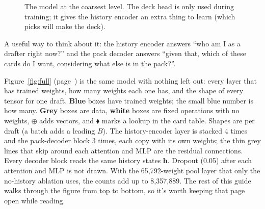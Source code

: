 \documentclass[11pt,letterpaper]{article}
\begin{document}
\begin{figure}[!htbp]
\centering
{}
\caption{The model at the coarsest level. The deck head is only used during training; it gives the
history encoder an extra thing to learn (which picks will make the deck).}
\label{fig:big}
\end{figure}

\noindent A useful way to think about it: the history encoder answers ``who am I as a drafter right now?''
and the pack decoder answers ``given that, which of these cards do I want, considering what else is in the
pack?''.

Figure~\ref{fig:full} (page~\pageref{fig:full}) is the same model with nothing left out: every layer that has
trained weights, how many weights each one has, and the shape of every tensor for one draft. \textbf{Blue}
boxes have trained weights; the small blue number is how many. \textbf{Grey} boxes are data, \textbf{white}
boxes are fixed operations with no weights, $\oplus$ adds vectors, and {\color{corange}$\blacklozenge$} marks a
lookup in the card table. Shapes are per draft (a batch adds a leading $B$). The history-encoder layer is
stacked 4 times and the pack-decoder block 3 times, each copy with its own weights; the thin grey lines that
skip around each attention and MLP are the residual connections. Every decoder block reads the same history
states $\mathbf h$. Dropout (0.05) after each attention and MLP is not drawn. With the 65,792-weight pool layer
that only the no-history ablation uses, the counts add up to 8,357,889. The rest of this guide walks through
the figure from top to bottom, so it's worth keeping that page open while reading.
\end{document}
